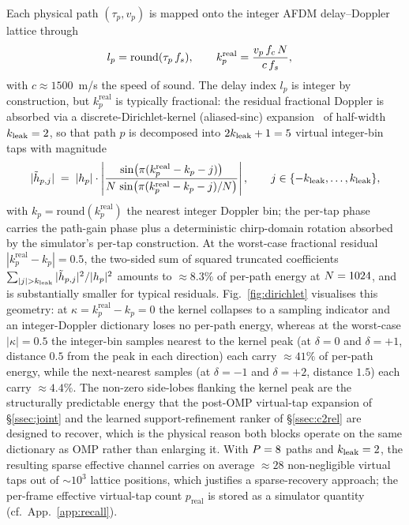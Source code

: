 Each physical path $(\tau_p, v_p)$ is mapped onto the integer AFDM delay--Doppler lattice through
\begin{align}
l_p &= \mathrm{round}(\tau_p \, f_s), \qquad
k_p^{\text{real}} = \frac{v_p \, f_c \, N}{c \, f_s}, \label{eq:delaydoppler_mapping}
\end{align}
with $c \approx 1500$~m/s the speed of sound. The delay index $l_p$ is integer by construction, but $k_p^{\text{real}}$ is typically fractional: the residual fractional Doppler is absorbed via a discrete-Dirichlet-kernel (aliased-sinc) expansion~\cite{yin2024drceafdm} of half-width $k_{\mathrm{leak}} = 2$, so that path $p$ is decomposed into $2k_{\mathrm{leak}} + 1 = 5$ virtual integer-bin taps with magnitude
\begin{equation}
|\tilde{h}_{p,j}| \;=\; |h_p| \cdot \left| \frac{\sin\bigl(\pi (k_p^{\text{real}} - k_p - j)\bigr)}{N \, \sin\bigl(\pi (k_p^{\text{real}} - k_p - j)/N\bigr)} \right|, \qquad j \in \{-k_{\mathrm{leak}}, \dots, k_{\mathrm{leak}}\}, \label{eq:dirichlet}
\end{equation}
with $k_p = \mathrm{round}(k_p^{\text{real}})$ the nearest integer Doppler bin; the per-tap phase carries the path-gain phase plus a deterministic chirp-domain rotation absorbed by the simulator's per-tap construction. At the worst-case fractional residual $|k_p^{\text{real}} - k_p| = 0.5$, the two-sided sum of squared truncated coefficients $\sum_{|j|>\kleak}|\tilde{h}_{p,j}|^2 / |h_p|^2$ amounts to $\approx 8.3\%$ of per-path energy at $N = 1024$, and is substantially smaller for typical residuals. Fig.~\ref{fig:dirichlet} visualises this geometry: at $\kappa = k_p^{\text{real}} - k_p = 0$ the kernel collapses to a sampling indicator and an integer-Doppler dictionary loses no per-path energy, whereas at the worst-case $|\kappa| = 0.5$ the integer-bin samples nearest to the kernel peak (at $\delta = 0$ and $\delta = +1$, distance $0.5$ from the peak in each direction) each carry $\approx 41\%$ of per-path energy, while the next-nearest samples (at $\delta = -1$ and $\delta = +2$, distance $1.5$) each carry $\approx 4.4\%$. The non-zero side-lobes flanking the kernel peak are the structurally predictable energy that the post-OMP virtual-tap expansion of \S\ref{ssec:joint} and the learned support-refinement ranker of \S\ref{ssec:c2rel} are designed to recover, which is the physical reason both blocks operate on the same dictionary as OMP rather than enlarging it. With $P = 8$ paths and $k_{\mathrm{leak}} = 2$, the resulting sparse effective channel carries on average $\approx 28$ non-negligible virtual taps out of $\sim 10^3$ lattice positions, which justifies a sparse-recovery approach; the per-frame effective virtual-tap count $p_{\text{real}}$ is stored as a simulator quantity (cf.\ App.~\ref{app:recall}).

